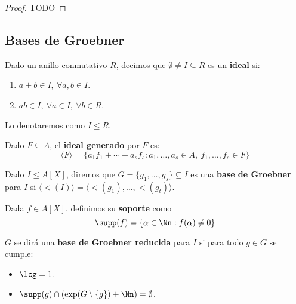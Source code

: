 \begin{proof}
    TODO
\end{proof}
\subsection{Bases de Groebner}

\begin{definicion}
    Dado un anillo conmutativo $R$, decimos que $\emptyset \neq I \subseteq R$ es un \textbf{ideal} si:
    \begin{enumerate}
        \item $a+b\in I,\ \forall a,b\in I$.
        \item $ab\in I,\ \forall a\in I,\ \forall b\in R$.
    \end{enumerate}

    Lo denotaremos como $I\le R$.
\end{definicion}

\begin{definicion}
    Dado $F\subseteq A$, el \textbf{ideal generado} por $F$ es:
    \begin{equation*}
        \langle F \rangle = \{a_1f_1 + \cdots + a_sf_s : a_1,\dots, a_s\in A,\ f_1,\dots, f_s\in F\}
    \end{equation*}
\end{definicion}

\begin{definicion}
    Dado $I\le A[X]$, diremos que $G = \{g_1,\dots, g_s\}\subseteq I$ es una \textbf{base de Groebner} para $I$ si $\langle \lt(I)\rangle = \langle \lt(g_1),\dots, \lt(g_t) \rangle$.
\end{definicion}

\begin{definicion}
    Dada $f\in A[X]$, definimos su \textbf{soporte} como $$\supp(f) = \{ \alpha\in\Nn : f(\alpha) \neq 0\}$$
\end{definicion}

\begin{definicion}
    $G$ se dirá una \textbf{base de Groebner reducida} para $I$ si para todo $g\in G$ se cumple:
    \begin{itemize}
        \item $\lcg=1$.
        \item $\supp(g) \cap \left(\exp(G\setminus\{g\}) + \Nn \right) = \emptyset$.
    \end{itemize}
\end{definicion}


